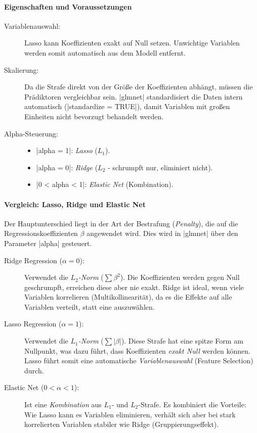 \documentclass[10pt,twocolumn]{scrartcl}
\renewcommand{\lstinline}{\mycoloredinline}
\begin{document}
\paragraph{Eigenschaften und Voraussetzungen}
\begin{description}
\item[Variablenauswahl:] Lasso kann Koeffizienten exakt auf Null setzen. Unwichtige Variablen werden somit automatisch aus dem Modell entfernt.
\item[Skalierung:] Da die Strafe direkt von der Größe der Koeffizienten abhängt, müssen die Prädiktoren vergleichbar sein. \lstinline|glmnet| standardisiert die Daten intern automatisch (\lstinline|standardize = TRUE|), damit Variablen mit großen Einheiten nicht bevorzugt behandelt werden.
\item[Alpha-Steuerung:]
  \begin{itemize}
  \item \lstinline|alpha = 1|: \emph{Lasso} ($L_1$).
  \item \lstinline|alpha = 0|: \emph{Ridge} ($L_2$ - schrumpft nur, eliminiert nicht).
  \item \lstinline|0 < alpha < 1|: \emph{Elastic Net} (Kombination).
  \end{itemize}
\end{description}

\paragraph{Vergleich: Lasso, Ridge und Elastic Net}

Der Hauptunterschied liegt in der Art der Bestrafung (\emph{Penalty}), die auf die Regressionskoeffizienten $\beta$ angewendet wird. Dies wird in \lstinline|glmnet| über den Parameter \lstinline|alpha| gesteuert.

\begin{description}
\item[Ridge Regression ($\alpha = 0$):] Verwendet die \emph{$L_2$-Norm} ($\sum \beta^2$). Die Koeffizienten werden gegen Null geschrumpft, erreichen diese aber nie exakt. Ridge ist ideal, wenn viele Variablen korrelieren (Multikollinearität), da es die Effekte auf alle Variablen verteilt, statt eine auszuwählen.
\item[Lasso Regression ($\alpha = 1$):] Verwendet die \emph{$L_1$-Norm} ($\sum |\beta|$). Diese Strafe hat eine spitze Form am Nullpunkt, was dazu führt, dass Koeffizienten \emph{exakt Null} werden können. Lasso führt somit eine automatische \emph{Variablenauswahl} (Feature Selection) durch.
\item[Elastic Net ($0 < \alpha < 1$):] Ist eine \emph{Kombination} aus $L_1$- und $L_2$-Strafe. Es kombiniert die Vorteile: Wie Lasso kann es Variablen eliminieren, verhält sich aber bei stark korrelierten Variablen stabiler wie Ridge (Gruppierungseffekt).
\end{description}
\end{document}

